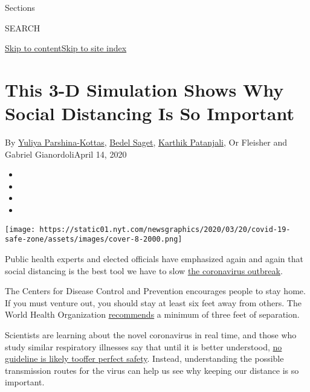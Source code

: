 Sections

SEARCH

\protect\hyperlink{site-content}{Skip to
content}\protect\hyperlink{site-index}{Skip to site index}

\hypertarget{this-3-d-simulation-shows-why-social-distancing-is-so-important}{%
\section{This 3-D Simulation Shows Why Social Distancing Is So
Important}\label{this-3-d-simulation-shows-why-social-distancing-is-so-important}}

By \href{https://www.nytimes.com/by/yuliya-parshina-kottas}{Yuliya
Parshina-Kottas}, \href{https://www.nytimes.com/by/bedel-saget}{Bedel
Saget}, \href{https://www.nytimes.com/by/karthik-patanjali}{Karthik
Patanjali}, Or Fleisher and Gabriel GianordoliApril 14, 2020

\begin{itemize}
\item
\item
\item
\item
\end{itemize}

\texttt{[image: https://static01.nyt.com/newsgraphics/2020/03/20/covid-19-safe-zone/assets/images/cover-8-2000.png]}

Public health experts and elected officials have emphasized again and
again that social distancing is the best tool we have to slow
\href{https://www.nytimes.com/news-event/coronavirus}{the coronavirus
outbreak}.

The Centers for Disease Control and Prevention encourages people to stay
home. If you must venture out, you should stay at least six feet away
from others. The World Health Organization
\href{https://www.who.int/emergencies/diseases/novel-coronavirus-2019/advice-for-public}{recommends}
a minimum of three feet of separation.

Scientists are learning about the novel coronavirus in real time, and
those who study similar respiratory illnesses say that until it is
better understood,
\href{https://www.nytimes.com/2020/04/14/health/coronavirus-six-feet.html}{no
guideline is likely
to}\href{https://www.nytimes.com/2020/04/14/health/coronavirus-six-feet.html}{offer
perfect safety}. Instead, understanding the possible transmission routes
for the virus can help us see why keeping our distance is so important.

